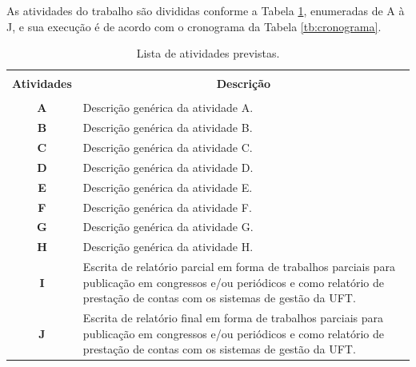 \documentclass[12pt,consuni]{uftpibic}
\begin{document}
As atividades do trabalho são divididas conforme a Tabela \ref{tb:atividades}, enumeradas de A à J, e sua execução é de acordo com o cronograma da Tabela \ref{tb:cronograma}.

\begin{table}[!h]
  \centering
  \footnotesize
  \caption{Lista de atividades previstas.}\label{tb:atividades}
  \begin{tabular}{cp{9.4cm}}
    \hline \hline &\\[-0.4cm]
    {\bf Atividades} & \multicolumn{1}{c}{\bf Descrição} \\
    \hline
    &\\[-0.4cm]
    \textbf{A} &  Descrição genérica da atividade A. \\[0.2cm]
    \textbf{B} &  Descrição genérica da atividade B.\\[0.2cm]
    \textbf{C} &  Descrição genérica da atividade C.\\[0.2cm]
    \textbf{D} &  Descrição genérica da atividade D. \\[0.2cm]
    \textbf{E} &  Descrição genérica da atividade E. \\[0.2cm]
    \textbf{F} &  Descrição genérica da atividade F.\\[0.2cm]
    \textbf{G} & Descrição genérica da atividade G.\\[0.2cm]
    \textbf{H} & Descrição genérica da atividade H. \\[0.2cm]
    \textbf{I} &  Escrita de relatório parcial em forma de trabalhos parciais para publicação em congressos e/ou periódicos e como relatório de prestação de contas com os sistemas de gestão da UFT. \\[0.2cm]
    \textbf{J} &  Escrita de relatório final em forma de trabalhos parciais para publicação em congressos e/ou periódicos e como relatório de prestação de contas com os sistemas de gestão da UFT. \\[0.2cm]
    \hline \hline
  \end{tabular}
\end{table}
\end{document}
